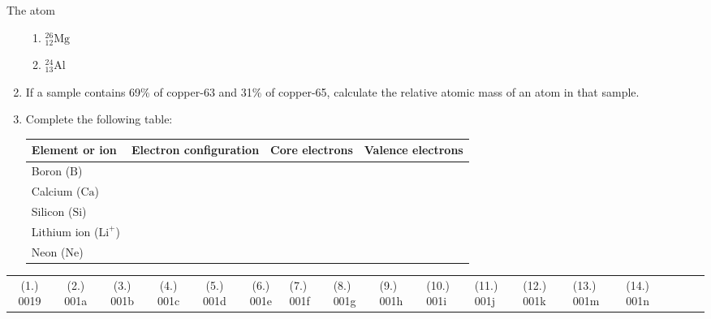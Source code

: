 \begin{eocexercises}{The atom}
\begin{enumerate}[noitemsep, label=\textbf{\arabic*}. ]
\begin{enumerate}[noitemsep, label=\textbf{\alph*}. ]
\item $_{12}^{26}\text{Mg}$
\item $_{13}^{24}\text{Al}$
\end{enumerate}
\item If a sample contains 69\% of copper-63 and 31\% of copper-65, calculate the relative atomic mass of an atom in that sample.\newline
\pagebreak
            \item Complete the following table:
          \begin{table}[H]
        \begin{center}
      \label{m38741*eip-282}
    \noindent
      \begin{tabular}{|l|l|l|l|}\hline
        Element or ion &
        Electron configuration &
        Core electrons &
        Valence electrons \\ \hline
        Boron ($\text{B}$) &
         &
         &
       \\ \hline
        Calcium ($\text{Ca}$) &
         &
         &
     \\ \hline
        Silicon ($\text{Si}$) &
         &
         &
       \\ \hline
        Lithium ion ($\text{Li}^{+}$) &
         &
         &
      \\ \hline
        Neon ($\text{Ne}$) &
         &
         &
     \\ \hline
    \end{tabular}
      \end{center}
\end{table}
\end{enumerate}
  \label{m38741**end}
  \label{ea1c9e59656f96ee804546971cf6dee6**end}
 \practiceinfo
 \begin{tabular}[h]{cccccc}
 (1.) 0019  &  (2.) 001a  &  (3.) 001b  &  (4.) 001c  &  (5.) 001d  &  (6.) 001e  &  (7.) 001f  &  (8.) 001g  &  (9.) 001h  &  (10.) 001i  &  (11.) 001j  &  (12.) 001k  &  (13.) 001m  &  (14.) 001n  &  & &  & \end{tabular}

\end{eocexercises}
